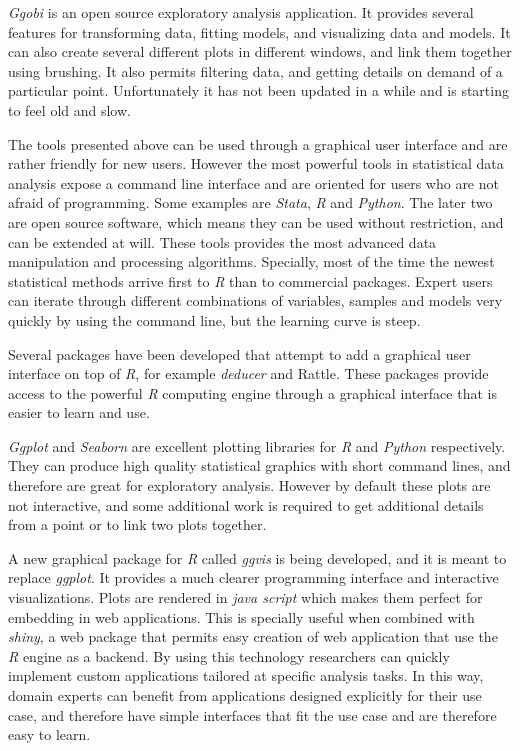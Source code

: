 \emph{Ggobi} \autocite{cook_interactive_2007} is an open source exploratory analysis application. It provides several features for transforming data, fitting models, and visualizing data and models. It can also create several different plots in different windows, and link them together using brushing. It also permits filtering data, and getting details on demand of a particular point. Unfortunately it has not been updated in a while and is starting to feel old and slow.


The tools presented above can be used through a graphical user interface and are rather friendly for new users. However the most powerful tools in statistical data analysis expose a command line interface and are oriented for users who are not afraid of programming. Some examples are \emph{Stata}, \emph{R} \autocite{team_r:_2012} and \emph{Python}. The later two are open source software, which means they can be used without restriction, and can be extended at will. These tools provides the most advanced data manipulation and processing algorithms. Specially, most of the time the newest statistical methods arrive first to \emph{R} than to commercial packages. Expert users can iterate through different combinations of variables, samples and models very quickly by using the command line, but the learning curve is steep. 

Several packages have been developed that attempt to add a graphical user interface on top of \emph{R}, for example \emph{deducer} and Rattle. These packages provide access to the powerful \emph{R} computing engine through a graphical interface that is easier to learn and use. 


\emph{Ggplot} \autocite{wickham_practical_2008} and \emph{Seaborn}
 \autocite{michael_waskom_seaborn:_2015} are excellent plotting libraries for \emph{R} and \emph{Python} respectively. They can produce high quality statistical graphics with short command lines, and therefore are great for exploratory analysis. However by default these plots are not interactive, and some additional work is required to get additional details from a point or to link two plots together. 

A new graphical package for \emph{R} called \emph{ggvis} is being developed, and it is meant to replace \emph{ggplot}. It provides a much clearer programming interface and interactive visualizations. Plots are rendered in \emph{java script} which makes them perfect for embedding in web applications. This is specially useful when combined with \emph{shiny}, a web package that permits easy creation of web application that use the \emph{R} engine as a backend. By using this technology researchers can quickly implement custom applications tailored at specific analysis tasks. In this way, domain experts can benefit from applications designed explicitly for their use case, and therefore have simple interfaces that fit the use case and are therefore easy to learn.

